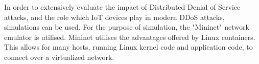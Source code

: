 In order to extensively evaluate the impact of Distributed Denial of Service
attacks, and the role which IoT devices play in modern DDoS attacks, simulations
can be used. For the purpose of simulation, the "Mininet" network emulator is
utilised. Mininet utilises the advantages offered by Linux containers. This
allows for many hosts, running Linux kernel code and application code, to
connect over a virtualized network.

